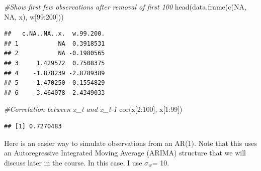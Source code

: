 \documentclass[
]{book}
\newenvironment{Shaded}{\begin{snugshade}}{\end{snugshade}}
\newcommand{\CommentTok}[1]{\textcolor[rgb]{0.56,0.35,0.01}{\textit{#1}}}
\newcommand{\ConstantTok}[1]{\textcolor[rgb]{0.00,0.00,0.00}{#1}}
\newcommand{\DecValTok}[1]{\textcolor[rgb]{0.00,0.00,0.81}{#1}}
\newcommand{\FunctionTok}[1]{\textcolor[rgb]{0.00,0.00,0.00}{#1}}
\newcommand{\NormalTok}[1]{#1}
\newcommand{\SpecialCharTok}[1]{\textcolor[rgb]{0.00,0.00,0.00}{#1}}
\theoremstyle{definition}
\theoremstyle{definition}
\theoremstyle{definition}
\theoremstyle{definition}
\theoremstyle{remark}
\begin{document}
\begin{Shaded}
\begin{Highlighting}[]
 \CommentTok{\#Show first few observations after removal of first 100}
  \FunctionTok{head}\NormalTok{(}\FunctionTok{data.frame}\NormalTok{(}\FunctionTok{c}\NormalTok{(}\ConstantTok{NA}\NormalTok{, }\ConstantTok{NA}\NormalTok{, x), w[}\DecValTok{99}\SpecialCharTok{:}\DecValTok{200}\NormalTok{]))}
\end{Highlighting}
\end{Shaded}

\begin{verbatim}
##   c.NA..NA..x.  w.99.200.
## 1           NA  0.3918531
## 2           NA -0.1980565
## 3     1.429572  0.7508375
## 4    -1.878239 -2.8789389
## 5    -1.470250 -0.1554829
## 6    -3.464078 -2.4349033
\end{verbatim}

\begin{Shaded}
\begin{Highlighting}[]
  \CommentTok{\#Correlation between x\_t and x\_t{-}1 }
  \FunctionTok{cor}\NormalTok{(x[}\DecValTok{2}\SpecialCharTok{:}\DecValTok{100}\NormalTok{], x[}\DecValTok{1}\SpecialCharTok{:}\DecValTok{99}\NormalTok{])}
\end{Highlighting}
\end{Shaded}

\begin{verbatim}
## [1] 0.7270483
\end{verbatim}

Here is an easier way to simulate observations from an AR(1). Note that this uses an Autoregressive Integrated Moving Average (ARIMA) structure that we will discuss later in the course. In this case, I use \(\sigma_w\)= 10.
\end{document}
